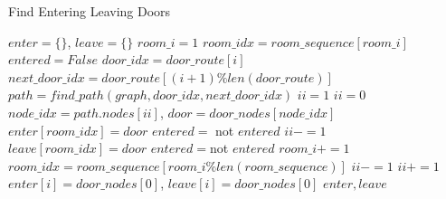 \begin{algorithm}[H]
\caption{Find Entering Leaving Doors}
\label{alg:find_entering_leaving_doors}
\begin{algorithmic}[1]
    \State $enter = \{\}$, $leave = \{\}$
        \State $room\_i = 1$  
        \State $room\_idx = room\_sequence[room\_i]$
        \State $entered = False$
            \State {}
            \State $door\_idx = door\_route[i]$
            \State $next\_door\_idx = door\_route[(i+1)\%len(door\_route)]$
            \State $path = find\_path(graph, door\_idx, next\_door\_idx)$
                \State $ii = 1$
            \Else
                \State $ii = 0$
            \EndIf
            \State {}
                \State $node\_idx = path.nodes[ii]$, $door = door\_nodes[node\_idx]$
                        \State $enter[room\_idx] = door$
                        \State $entered =$ not $entered$
                            \State $ii -= 1$    
                        \EndIf
                    \Else
                        \State $leave[room\_idx] = door$
                        \State $entered = $not  $entered$
                        \State $room\_i += 1$
                        \State $room\_idx = room\_sequence[room\_i\%len(room\_sequence)]$
                        \State $ii -= 1$
                    \EndIf
                \EndIf
                \State $ii += 1$
            \EndWhile
        \EndFor
    \Else
            \State $enter[i] = door\_nodes[0]$, $leave[i] = door\_nodes[0]$
        \EndFor
    \EndIf
    \State \Return $enter, leave$
\end{algorithmic}
\end{algorithm}
